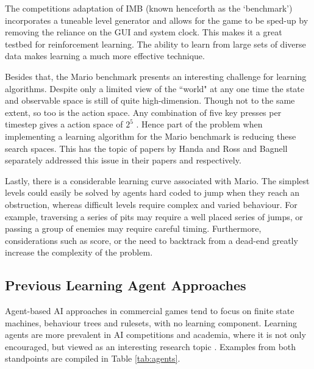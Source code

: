 The competitions adaptation of IMB (known henceforth as the `benchmark') incorporates a tuneable level generator and allows for the game to be sped-up by removing the reliance on the GUI and system clock. This makes it a great testbed for reinforcement learning. The ability to learn from large sets of diverse data makes learning a much more effective technique. \cite[p.~3]{2012the}

Besides that, the Mario benchmark presents an interesting challenge for learning algorithms. Despite only a limited view of the ``world" at any one time the state and observable space is still of quite high-dimension. Though not to the same extent, so too is the action space. Any combination of five key presses per timestep gives a action space of $2^5$ \cite[p.~3]{2012the}. Hence part of the problem when implementing a learning algorithm for the Mario benchmark is reducing these search spaces. This has the topic of papers by Handa and Ross and Bagnell \cite{rossbagnell} separately addressed this issue in their papers \cite{handa} and \cite{rossbagnell} respectively.

Lastly, there is a considerable learning curve associated with Mario. The simplest levels could easily be solved by agents hard coded to jump when they reach an obstruction, whereas difficult levels require complex and varied behaviour. For example, traversing a series of pits may require a well placed series of jumps, or passing a group of enemies may require careful timing. Furthermore, considerations such as score, or the need to backtrack from a dead-end greatly increase the complexity of the problem. \cite[p.~3, p.~12]{2012the}



\subsection{Previous Learning Agent Approaches}
\label{ssec:prevagents}

Agent-based AI approaches in commercial games tend to focus on finite state machines, behaviour trees and rulesets, with no learning component. Learning agents are more prevalent in AI competitions and academia, where it is not only encouraged, but viewed as an interesting research topic \cite[p.~1]{marioaicomp}. Examples from both standpoints are compiled in Table \ref{tab:agents}.

